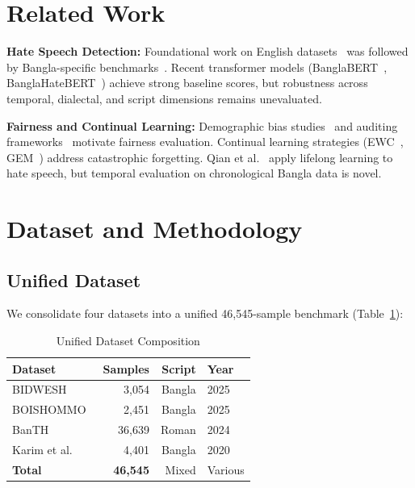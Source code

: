 \documentclass[conference]{IEEEtran}
\begin{document}
\section{Related Work}

\textbf{Hate Speech Detection:} Foundational work on English datasets~\cite{founta2018large,davidson2017hate} was followed by Bangla-specific benchmarks~\cite{karim2020,das2022bengali}. Recent transformer models (BanglaBERT~\cite{bhattacharjee2022banglaber}, BanglaHateBERT~\cite{jahan2022banglahatebert}) achieve strong baseline scores, but robustness across temporal, dialectal, and script dimensions remains unevaluated.

\textbf{Fairness and Continual Learning:} Demographic bias studies~\cite{bolukbasi2016man,buolamwini2018gender} and auditing frameworks~\cite{raji2020closing} motivate fairness evaluation. Continual learning strategies (EWC~\cite{kirkpatrick2017overcoming}, GEM~\cite{lopez2017gradient}) address catastrophic forgetting. Qian et al.~\cite{qian2021lifelong} apply lifelong learning to hate speech, but temporal evaluation on chronological Bangla data is novel.

\section{Dataset and Methodology}
\label{sec:dataset}

\subsection{Unified Dataset}

We consolidate four datasets into a unified 46,545-sample benchmark (Table~\ref{tab:dataset}):

\begin{table}[h]
\centering
\caption{Unified Dataset Composition}
\label{tab:dataset}
\begin{tabular}{lrrl}
\toprule
\textbf{Dataset} & \textbf{Samples} & \textbf{Script} & \textbf{Year} \\
\midrule
BIDWESH~\cite{fayaz2025bidwesh} & 3,054 & Bangla & 2025 \\
BOISHOMMO~\cite{kafi2025boishommo} & 2,451 & Bangla & 2025 \\
BanTH~\cite{haider2024banth} & 36,639 & Roman & 2024 \\
Karim et al.~\cite{karim2020} & 4,401 & Bangla & 2020 \\
\midrule
\textbf{Total} & \textbf{46,545} & Mixed & Various \\
\bottomrule
\end{tabular}
\end{table}
\end{document}

